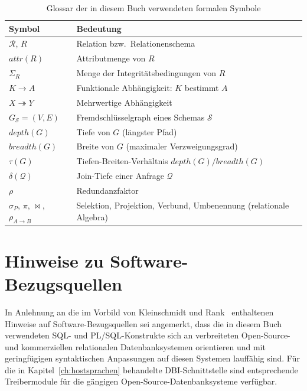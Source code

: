 ﻿\documentclass[a4paper,12pt]{report}
\theoremstyle{definition}
\theoremstyle{remark}
\newcommand{\R}{\mathcal{R}}
\newcommand{\att}{\mathit{attr}}
\newcommand{\depth}{\mathit{depth}}
\newcommand{\breadth}{\mathit{breadth}}
\begin{document}
\begin{table}[H]
\centering
\small
\begin{tabular}{@{}lp{10cm}@{}}
\toprule
\textbf{Symbol} & \textbf{Bedeutung} \\
\midrule
$\R$, $R$ & Relation bzw.\ Relationenschema \\
$\att(R)$ & Attributmenge von $R$ \\
$\Sigma_R$ & Menge der Integritätsbedingungen von $R$ \\
$K \to A$ & Funktionale Abhängigkeit: $K$ bestimmt $A$ \\
$X \twoheadrightarrow Y$ & Mehrwertige Abhängigkeit \\
$G_{\mathcal{S}} = (V,E)$ & Fremdschlüsselgraph eines Schemas $\mathcal{S}$ \\
$\depth(G)$ & Tiefe von $G$ (längster Pfad) \\
$\breadth(G)$ & Breite von $G$ (maximaler Verzweigungsgrad) \\
$\tau(G)$ & Tiefen-Breiten-Verhältnis $\depth(G)/\breadth(G)$ \\
$\delta(\mathcal{Q})$ & Join-Tiefe einer Anfrage $\mathcal{Q}$ \\
$\rho$ & Redundanzfaktor \\
$\sigma_P$, $\pi$, $\Join$, $\rho_{A\to B}$ & Selektion, Projektion, Verbund, Umbenennung (relationale Algebra) \\
\bottomrule
\end{tabular}
\caption{Glossar der in diesem Buch verwendeten formalen Symbole}
\end{table}

\section{Hinweise zu Software-Bezugsquellen}

In Anlehnung an die im Vorbild von Kleinschmidt und
Rank~\cite{Kleinschmidt2002} enthaltenen Hinweise auf
Software-Bezugsquellen sei angemerkt, dass die in diesem Buch
verwendeten SQL- und PL/SQL-Konstrukte sich an verbreiteten
Open-Source- und kommerziellen relationalen Datenbanksystemen
orientieren und mit geringfügigen syntaktischen Anpassungen auf diesen
Systemen lauffähig sind. Für die in Kapitel~\ref{ch:hostsprachen}
behandelte DBI-Schnittstelle sind entsprechende Treibermodule für die
gängigen Open-Source-Datenbanksysteme verfügbar.
\end{document}
